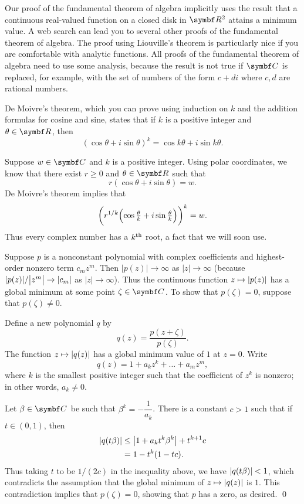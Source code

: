 Our proof of the fundamental theorem of algebra implicitly uses the result that a continuous real-valued function on a closed disk in $\R 2$ attains a minimum value.
A web search can lead you to several other proofs of the fundamental theorem of algebra. The proof using Liouville's theorem is particularly nice if you are comfortable with analytic functions. All proofs of the fundamental theorem of algebra need to use some analysis, because the result is not true if $\C{}$ is replaced, for example, with the set of numbers of the form $c + di$ where $c, d$ are rational numbers.


\proof
De Moivre's theorem, which you can prove using induction on $k$ and the addition formulas for cosine and sine, states that if $k$ is a positive integer and $\theta \in \R{}$, then
\[
(\cos \theta + i \sin \theta)^k = \cos k\theta + i \sin k\theta.
\]

Suppose $w \in \C{}$ and $k$ is a positive integer. Using polar coordinates, we know that there exist $r \ge 0$ and $\theta \in \R{}$ such that
\[
r(\cos \theta + i \sin \theta) = w.
\]
De Moivre's theorem implies that
\[
\paren[\bigg]{ r^{1/k} \paren[\Big]{\cos \tfrac{\theta}{k} + i \sin \tfrac{\theta}{k} } }^k = w.
\]
Thus every complex number has a $k^\nth$ root, a fact that we will soon use.

Suppose $p$ is a nonconstant polynomial with complex coefficients and highest-order nonzero term $c_m z^m\!$. Then
$|p(z)| \rightarrow \infty$ as $|z| \rightarrow \infty$
(because $\abs{p(z)}/\abs[\big]{z^m} \to \abs{c_m}$ as $|z| \rightarrow \infty$).
Thus the continuous function $z \mapsto \abs{p(z)}$ has a global minimum at some point $\zeta \in \C{}$. To show that $p(\zeta) = 0$, suppose that $p(\zeta) \ne 0$.

Define a new polynomial $q$ by
\[
q(z) = \frac{p(z + \zeta)}{p(\zeta)}.
\]
The function $z \mapsto \abs{q(z)}$ has a global minimum value of $1$ at $z = 0$.
Write
\[
 q(z) = 1 + a_k z^k + \dots + a_m z^m\!,
 \]
 where $k$ is the smallest positive integer such that the coefficient of $z^k$ is nonzero; in other words, $a_k \ne 0$.

 Let $\beta \in \C{}$ be such that
$
 \beta^k = -\dfrac{1}{a_k}$.
 There is a constant $c > 1$ such that if $t \in (0, 1)$, then
 \begin{align*}
 \abs{q(t\beta)} &\le \abs[\big]{ 1 + a_k t^k \beta^k } + t^{k+1}c \\
 &= 1 - t^k(1 - tc).
 \end{align*}
 Thus taking $t$ to be $1/(2c)$ in the inequality above, we have $\abs{q(t \beta)} < 1$, which contradicts the assumption that the global minimum of $z \mapsto \abs{q(z)}$ is $1$. This contradiction implies that $p(\zeta) = 0$, showing that $p$ has a zero, as desired.
 \qed

